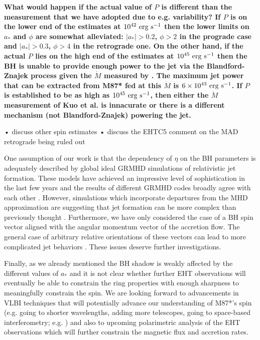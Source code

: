 \documentclass[twocolumn, linenumbers]{aastex62} %
\begin{document}
\textbf{What would happen if the actual value of $P$ is different than the measurement that we have adopted due to e.g. variability? If $P$ is on the lower end of the estimates at $10^{42} \ {\rm erg \ s}^{-1}$  then the lower limits on $a_*$ and $\phi$ are somewhat alleviated: $|a_*| > 0.2$, $\phi > 2$ in the prograde case and $|a_*| > 0.3$, $\phi > 4$ in the retrograde one. On the other hand, if the actual $P$ lies on the high end of the estimates at $10^{45} \ {\rm erg \ s}^{-1}$  then the BH is unable to provide enough power to the jet via the Blandford-Znajek process given the $\dot{M}$ measured by \cite{Kuo2014}. The maximum jet power that can be extracted from M87* fed at this $\dot{M}$ is $6 \times 10^{43} \ {\rm erg \ s}^{-1}$. If $P$ is established to be as high as $10^{45} \ {\rm erg \ s}^{-1}$, then either the $\dot{M}$ measurement of Kuo et al. is innacurate or there is a different mechanism (not Blandford-Znajek) powering the jet.}

• discuss other spin estimates 
• discuss the EHTC5 comment on the MAD retrograde being ruled out

One assumption of our work is that the dependency of $\eta$ on the BH parameters is adequately described by global ideal GRMHD simulations of relativistic jet formation. These models have achieved an impressive level of sophistication in the last few years and the results of different GRMHD codes broadly agree with each other . However, simulations which incorporate departures from the MHD approximation are suggesting that jet formation can be more complex than previously thought \citep{Parfrey2019}. Furthermore, we have only considered the case of a BH spin vector aligned with the angular momentum vector of the accretion flow. The general case of arbitrary relative orientations of these vectors can lead to more complicated jet behaviors \citep{Liska2018}. These issues deserve further investigations. 

Finally, as we already mentioned the BH shadow is weakly affected by the different values of $a_*$ and it is not clear whether further EHT observations will eventually be able to constrain the ring properties with enough sharpness to meaningfully constrain the spin. We are looking forward to advancements in VLBI techniques that will potentially advance our understanding of M87*'s spin (e.g. going to shorter wavelengths, adding more telescopes, going to space-based interferometry; e.g. \citealt{Roelofs2019}) and also to upcoming polarimetric analysis of the EHT observations which will further constrain the magnetic flux and accretion rates.
\end{document}
